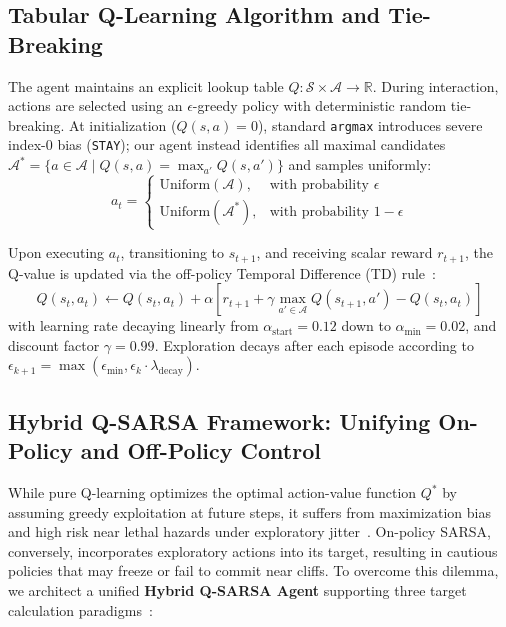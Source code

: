 \subsection{Tabular Q-Learning Algorithm and Tie-Breaking}
The agent maintains an explicit lookup table $Q: \mathcal{S} \times \mathcal{A} \to \mathbb{R}$. During interaction, actions are selected using an $\epsilon$-greedy policy with deterministic random tie-breaking. At initialization ($Q(s, a) = 0$), standard \texttt{argmax} introduces severe index-0 bias (\texttt{STAY}); our agent instead identifies all maximal candidates $\mathcal{A}^* = \{a \in \mathcal{A} \mid Q(s, a) = \max_{a'} Q(s, a')\}$ and samples uniformly:
\begin{equation}
a_t = \begin{cases}
\text{Uniform}(\mathcal{A}), & \text{with probability } \epsilon \\
\text{Uniform}(\mathcal{A}^*), & \text{with probability } 1 - \epsilon
\end{cases}
\end{equation}

Upon executing $a_t$, transitioning to $s_{t+1}$, and receiving scalar reward $r_{t+1}$, the Q-value is updated via the off-policy Temporal Difference (TD) rule~\cite{watkins1992q}:
\begin{equation}
Q(s_t, a_t) \leftarrow Q(s_t, a_t) + \alpha \left[ r_{t+1} + \gamma \max_{a' \in \mathcal{A}} Q(s_{t+1}, a') - Q(s_t, a_t) \right]
\end{equation}
with learning rate decaying linearly from $\alpha_{\text{start}} = 0.12$ down to $\alpha_{\min} = 0.02$, and discount factor $\gamma = 0.99$. Exploration decays after each episode according to $\epsilon_{k+1} = \max(\epsilon_{\min}, \epsilon_k \cdot \lambda_{\text{decay}})$.

\subsection{Hybrid Q-SARSA Framework: Unifying On-Policy and Off-Policy Control}
\label{subsec:hybrid_formulation}
While pure Q-learning optimizes the optimal action-value function $Q^*$ by assuming greedy exploitation at future steps, it suffers from maximization bias and high risk near lethal hazards under exploratory jitter~\cite{sutton2018reinforcement}. On-policy SARSA, conversely, incorporates exploratory actions into its target, resulting in cautious policies that may freeze or fail to commit near cliffs. To overcome this dilemma, we architect a unified \textbf{Hybrid Q-SARSA Agent} supporting three target calculation paradigms~\cite{van2009theoretical,de2018multi}:

